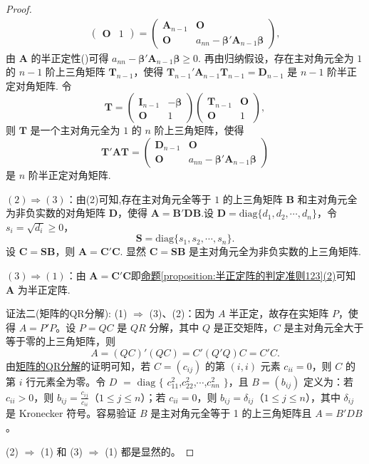 \documentclass[../../main.tex]{subfiles}%
\begin{document}
\begin{proof}
\begin{align*}
\begin{pmatrix}
\boldsymbol{O} & 1
\end{pmatrix}=
\begin{pmatrix}
\boldsymbol{A}_{n - 1} & \boldsymbol{O} \\
\boldsymbol{O} & a_{nn}-\boldsymbol{\beta}'\boldsymbol{A}_{n - 1}\boldsymbol{\beta}
\end{pmatrix},
\end{align*}
由 $\boldsymbol{A}$ 的半正定性()可得 $a_{nn}-\boldsymbol{\beta}'\boldsymbol{A}_{n - 1}\boldsymbol{\beta}\geqslant 0$. 再由归纳假设，存在主对角元全为 $1$ 的 $n - 1$ 阶上三角矩阵 $\boldsymbol{T}_{n - 1}$，使得 $\boldsymbol{T}_{n - 1}'\boldsymbol{A}_{n - 1}\boldsymbol{T}_{n - 1}=\boldsymbol{D}_{n - 1}$ 是 $n - 1$ 阶半正定对角矩阵. 令
\[
\boldsymbol{T}=\begin{pmatrix}
\boldsymbol{I}_{n - 1} & -\boldsymbol{\beta} \\
\boldsymbol{O} & 1
\end{pmatrix}
\begin{pmatrix}
\boldsymbol{T}_{n - 1} & \boldsymbol{O} \\
\boldsymbol{O} & 1
\end{pmatrix},
\]
则 $\boldsymbol{T}$ 是一个主对角元全为 $1$ 的 $n$ 阶上三角矩阵，使得
\[
\boldsymbol{T}'\boldsymbol{A}\boldsymbol{T}=\begin{pmatrix}
\boldsymbol{D}_{n - 1} & \boldsymbol{O} \\
\boldsymbol{O} & a_{nn}-\boldsymbol{\beta}'\boldsymbol{A}_{n - 1}\boldsymbol{\beta}
\end{pmatrix}
\]
是 $n$ 阶半正定对角矩阵.

$(2)\Rightarrow(3)$：由(2)可知,存在主对角元全等于 $1$ 的上三角矩阵 $\boldsymbol{B}$ 和主对角元全为非负实数的对角矩阵 $\boldsymbol{D}$，使得 $\boldsymbol{A}=\boldsymbol{B}'\boldsymbol{D}\boldsymbol{B}$.设 $\boldsymbol{D}=\mathrm{diag}\{d_1,d_2,\cdots,d_n\}$，令 $s_i = \sqrt{d_i}\geqslant 0$，
\[
\boldsymbol{S}=\mathrm{diag}\{s_1,s_2,\cdots,s_n\}.
\]
设 $\boldsymbol{C}=\boldsymbol{S}\boldsymbol{B}$，则 $\boldsymbol{A}=\boldsymbol{C}'\boldsymbol{C}$. 显然 $\boldsymbol{C}=\boldsymbol{S}\boldsymbol{B}$ 是主对角元全为非负实数的上三角矩阵.

$(3)\Rightarrow(1)$：由 $\boldsymbol{A}=\boldsymbol{C}'\boldsymbol{C}$即\hyperref[proposition:半正定阵的判定准则123]{命题\ref{proposition:半正定阵的判定准则123}(2)}可知 $\boldsymbol{A}$ 为半正定阵.

{\color{blue}证法二(矩阵的QR分解):}
(1) $\Rightarrow$ (3)、(2)：因为 $A$ 半正定，故存在实矩阵 $P$，使得 $A = P'P$。设 $P = QC$ 是 $QR$ 分解，其中 $Q$ 是正交矩阵，$C$ 是主对角元全大于等于零的上三角矩阵，则
\[
A=(QC)'(QC)=C'(Q'Q)C = C'C.
\]
由\hyperref[theorem:矩阵的QR分解]{矩阵的QR分解}的证明可知，若 $C = (c_{ij})$ 的第 $(i,i)$ 元素 $c_{ii}=0$，则 $C$ 的第 $i$ 行元素全为零。令 $D$ $=$ $\mathrm{diag}$ $\{$ $c_{11}^2$,$c_{22}^2$,$\cdots$,$c_{nn}^2$ $\}$，且 $B = (b_{ij})$ 定义为：若 $c_{ii}>0$，则 $b_{ij}=\frac{c_{ij}}{c_{ii}}$（$1\leqslant  j\leqslant  n$）；若 $c_{ii}=0$，则 $b_{ij}=\delta_{ij}$（$1\leqslant  j\leqslant  n$），其中 $\delta_{ij}$ 是 Kronecker 符号。容易验证 $B$ 是主对角元全等于 1 的上三角矩阵且 $A = B'DB$。

(2) $\Rightarrow$ (1) 和 (3) $\Rightarrow$ (1) 都是显然的。 
\end{proof}
\end{document}

